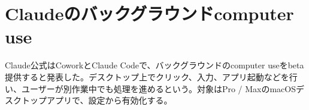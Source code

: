 \section{Claudeのバックグラウンドcomputer use}
Claude公式はCoworkとClaude Codeで、バックグラウンドのcomputer useをbeta提供すると発表した。デスクトップ上でクリック、入力、アプリ起動などを行い、ユーザーが別作業中でも処理を進めるという。対象はPro / MaxのmacOSデスクトップアプリで、設定から有効化する。
